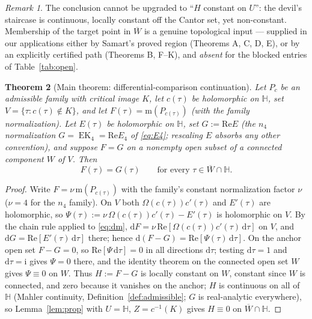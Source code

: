 \documentclass[11pt]{article}
\newcommand{\m}{\mathrm{m}}                 %
\newcommand{\Hh}{\mathbb{H}}
\newcommand{\ii}{\mathrm{i}}
\newcommand{\id}{\mathrm{d}}
\newcommand{\ReT}{\mathrm{Re}}
\DeclareMathOperator{\EK}{EK}
\newtheorem{theorem}{Theorem}[section]
\theoremstyle{definition}
\theoremstyle{remark}
\newtheorem{remark}[theorem]{Remark}
\begin{document}
\begin{remark}\label{rem:devil}
The conclusion cannot be upgraded to ``$H$ constant on $U$'': the
devil's staircase is continuous, locally constant off the Cantor set,
yet non-constant. Membership of the target point in $\overline W$ is
a genuine topological input --- supplied in our applications either
by Samart's proved region (Theorems A, C, D, E), or by an explicitly
certified path (Theorems B, F--K), and \emph{absent} for the blocked
entries of Table~\ref{tab:open}.
\end{remark}

\begin{theorem}[Main theorem: differential-comparison continuation]
\label{thm:main}
Let $P_c$ be an admissible family with critical image $K$, let
$c(\tau)$ be holomorphic on $\Hh$, set
$V=\{\tau:c(\tau)\notin K\}$, and let $F(\tau)=\m(P_{c(\tau)})$
\textup{(}with the family normalization\textup{)}. Let $E(\tau)$ be
holomorphic on $\Hh$, set $G:=\ReT E$ (the $n_4$ normalization
$G=\EK_4=\ReT E_4$ of \eqref{eq:E4}; rescaling $E$ absorbs any
other convention), and suppose $F=G$ on a nonempty
open subset of a connected component $W$ of $V$. Then
\begin{equation}\label{eq:mainconcl}
  F(\tau)=G(\tau)\qquad\text{for every }
  \tau\in\overline{W}\cap\Hh .
\end{equation}
\end{theorem}
\begin{proof}
Write $F=\nu\,\m(P_{c(\tau)})$ with the family's constant
normalization factor $\nu$ ($\nu=4$ for the $n_4$ family).
On $V$ both $\Omega(c(\tau))c'(\tau)$ and $E'(\tau)$ are holomorphic,
so $\Psi(\tau):=\nu\,\Omega(c(\tau))c'(\tau)-E'(\tau)$ is
holomorphic on $V$. By the chain rule applied to \eqref{eq:dm},
$\id F=\nu\,\ReT[\Omega(c(\tau))c'(\tau)\,\id\tau]$ on $V$, and
$\id G=\ReT[E'(\tau)\,\id\tau]$ there; hence
$\id(F-G)=\ReT[\Psi(\tau)\,\id\tau]$. On the anchor open set
$F-G=0$, so $\ReT[\Psi\,\id\tau]=0$ in all directions
$\id\tau$; testing $\id\tau=1$ and $\id\tau=\ii$ gives $\Psi=0$
there, and the identity theorem on the connected open set $W$ gives
$\Psi\equiv0$ on $W$. Thus $H:=F-G$ is locally constant on $W$,
constant since $W$ is connected, and zero because it vanishes on the
anchor; $H$ is continuous on all of $\Hh$ (Mahler continuity,
Definition~\ref{def:admissible}; $G$ is real-analytic everywhere), so
Lemma~\ref{lem:prop} with $U=\Hh$, $Z=c^{-1}(K)$ gives
$H\equiv0$ on $\overline W\cap\Hh$.
\end{proof}
\end{document}
